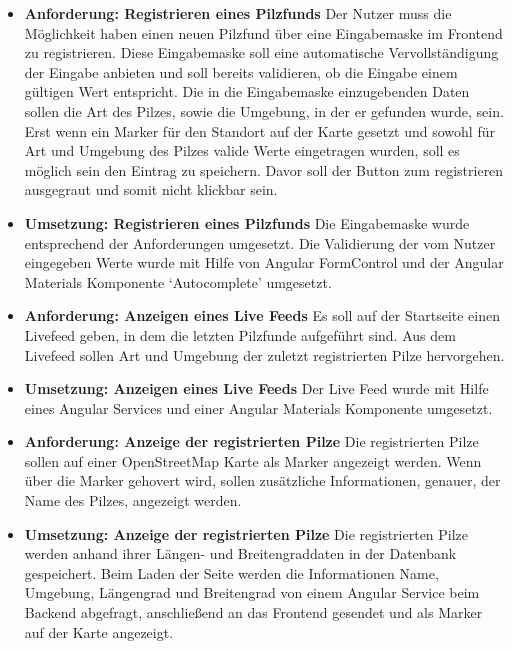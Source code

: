 \begin{itemize}

	\item \textbf{Anforderung: Registrieren eines Pilzfunds}
	      Der Nutzer muss die Möglichkeit haben einen neuen Pilzfund über eine Eingabemaske im Frontend zu registrieren. Diese Eingabemaske soll eine
	      automatische Vervollständigung der Eingabe anbieten und soll bereits validieren, ob die Eingabe einem gültigen Wert entspricht. Die in die
	      Eingabemaske einzugebenden Daten sollen die Art des Pilzes, sowie die Umgebung, in der er gefunden wurde, sein. Erst wenn ein Marker für den
	      Standort auf der Karte gesetzt und sowohl für Art und Umgebung des Pilzes valide Werte eingetragen wurden, soll es möglich sein den Eintrag zu
	      speichern. Davor soll der Button zum registrieren ausgegraut und somit nicht klickbar sein.

	\item \textbf{Umsetzung: Registrieren eines Pilzfunds}
	      Die Eingabemaske wurde entsprechend der Anforderungen umgesetzt. Die Validierung der vom Nutzer eingegeben Werte wurde mit Hilfe von Angular
	      FormControl und der Angular Materials Komponente `Autocomplete' umgesetzt.

	\item \textbf{Anforderung: Anzeigen eines Live Feeds}
	      Es soll auf der Startseite einen Livefeed geben, in dem die letzten Pilzfunde aufgeführt sind. Aus dem Livefeed sollen Art und Umgebung der
	      zuletzt registrierten Pilze hervorgehen.

	\item \textbf{Umsetzung: Anzeigen eines Live Feeds}
	      Der Live Feed wurde mit Hilfe eines Angular Services und einer Angular Materials Komponente umgesetzt.

	\item \textbf{Anforderung: Anzeige der registrierten Pilze}
	      Die registrierten Pilze sollen auf einer OpenStreetMap Karte als Marker angezeigt werden. Wenn über die Marker gehovert wird, sollen zusätzliche
	      Informationen, genauer, der Name des Pilzes, angezeigt werden.

	\item \textbf{Umsetzung: Anzeige der registrierten Pilze}
	      Die registrierten Pilze werden anhand ihrer Längen- und Breitengraddaten in der Datenbank gespeichert. Beim Laden der Seite werden die Informationen
	      Name, Umgebung, Längengrad und Breitengrad von einem Angular Service beim Backend abgefragt, anschließend an das Frontend gesendet und als Marker auf
	      der Karte angezeigt.


\end{itemize}
